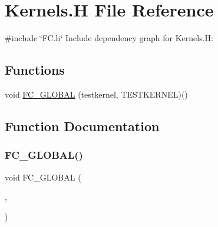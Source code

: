 \hypertarget{Kernels_8H}{}\section{Kernels.\+H File Reference}
\label{Kernels_8H}
{\ttfamily \#include \char`\"{}F\+C.\+h\char`\"{}}\newline
Include dependency graph for Kernels.\+H\+:
\subsection*{Functions}
\begin{DoxyCompactItemize}
\item 
void \hyperlink{Kernels_8H_ad0cbe87fedea27c84ed80302eb823435}{F\+C\+\_\+\+G\+L\+O\+B\+AL} (testkernel, T\+E\+S\+T\+K\+E\+R\+N\+EL)()
\end{DoxyCompactItemize}


\subsection{Function Documentation}
\hypertarget{Kernels_8H_ad0cbe87fedea27c84ed80302eb823435}{}\label{Kernels_8H_ad0cbe87fedea27c84ed80302eb823435} 
\subsubsection{\texorpdfstring{F\+C\+\_\+\+G\+L\+O\+B\+A\+L()}{FC\_GLOBAL()}}
{\footnotesize\ttfamily void F\+C\+\_\+\+G\+L\+O\+B\+AL (\begin{DoxyParamCaption}\item[{testkernel}]{,  }\item[{T\+E\+S\+T\+K\+E\+R\+N\+EL}]{ }\end{DoxyParamCaption})}

